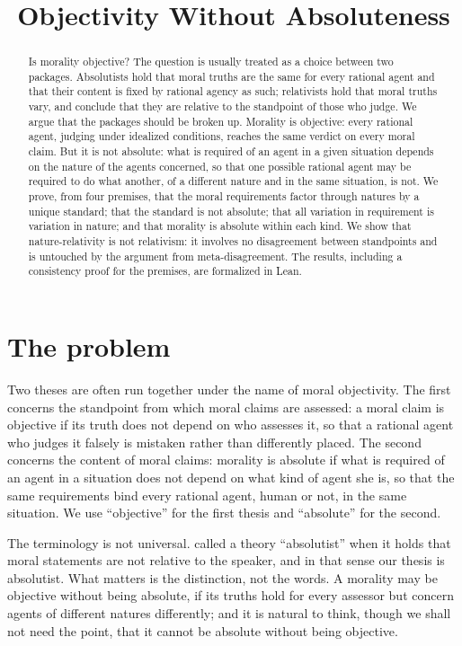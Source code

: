 \documentclass{situationist-preprint}
\title{Objectivity Without Absoluteness}
\begin{document}
\maketitle

\begin{abstract}
Is morality objective? The question is usually treated as a choice between two packages. Absolutists hold that moral truths are the same for every rational agent and that their content is fixed by rational agency as such; relativists hold that moral truths vary, and conclude that they are relative to the standpoint of those who judge. We argue that the packages should be broken up. Morality is objective: every rational agent, judging under idealized conditions, reaches the same verdict on every moral claim. But it is not absolute: what is required of an agent in a given situation depends on the nature of the agents concerned, so that one possible rational agent may be required to do what another, of a different nature and in the same situation, is not. We prove, from four premises, that the moral requirements factor through natures by a unique standard; that the standard is not absolute; that all variation in requirement is variation in nature; and that morality is absolute within each kind. We show that nature-relativity is not relativism: it involves no disagreement between standpoints and is untouched by the argument from meta-disagreement. The results, including a consistency proof for the premises, are formalized in Lean.
\end{abstract}

\section{The problem}

Two theses are often run together under the name of moral objectivity. The first concerns the standpoint from which moral claims are assessed: a moral claim is objective if its truth does not depend on who assesses it, so that a rational agent who judges it falsely is mistaken rather than differently placed. The second concerns the content of moral claims: morality is absolute if what is required of an agent in a situation does not depend on what kind of agent she is, so that the same requirements bind every rational agent, human or not, in the same situation. We use \enquote{objective} for the first thesis and \enquote{absolute} for the second.

The terminology is not universal. \citet{Firth1952} called a theory \enquote{absolutist} when it holds that moral statements are not relative to the speaker, and in that sense our thesis is absolutist. What matters is the distinction, not the words. A morality may be objective without being absolute, if its truths hold for every assessor but concern agents of different natures differently; and it is natural to think, though we shall not need the point, that it cannot be absolute without being objective.
\end{document}

